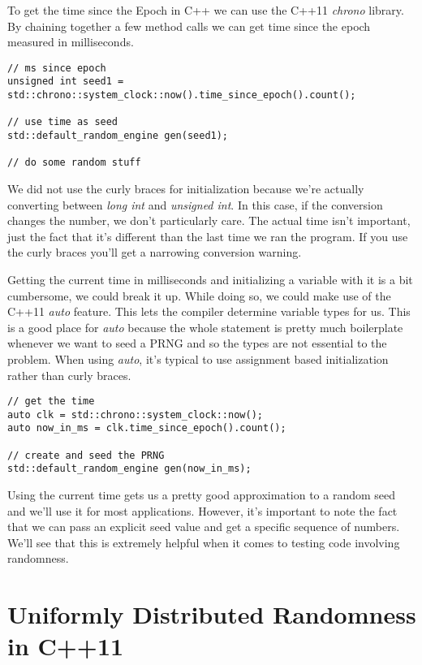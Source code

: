 \documentclass[]{tufte-handout}
\begin{document}
To get the time since the Epoch in C++ we can use the C++11 \textit{chrono} library. By chaining together a few method calls we can get time since the epoch measured in milliseconds.
\begin{verbatim}
// ms since epoch
unsigned int seed1 = std::chrono::system_clock::now().time_since_epoch().count();

// use time as seed
std::default_random_engine gen(seed1);    

// do some random stuff
\end{verbatim}
We did not use the curly braces for initialization because we're actually converting between \textit{long int} and \textit{unsigned int}. In this case, if the conversion changes the number, we don't particularly care.  The actual time isn't important, just the fact that it's different than the last time we ran the program. If you use the curly braces you'll get a narrowing conversion warning. 

Getting the current time in milliseconds and initializing a variable with it is a bit cumbersome, we could break it up. While doing so, we could make use of the C++11 \textit{auto} feature. This lets the compiler determine variable types for us. This is a good place for \textit{auto} because the whole statement is pretty much boilerplate whenever we want to seed a PRNG and so the types are not essential to the problem. When using \textit{auto}, it's typical to use assignment based initialization rather than curly braces. 

\begin{verbatim}
// get the time 
auto clk = std::chrono::system_clock::now();
auto now_in_ms = clk.time_since_epoch().count();

// create and seed the PRNG
std::default_random_engine gen(now_in_ms);    
\end{verbatim}

Using the current time gets us a pretty good approximation to a random seed and we'll use it for most applications. However, it's important to note the fact that we can pass an explicit seed value and get a specific sequence of numbers.  We'll see that this is extremely helpful when it comes to testing code involving randomness. 

\section{Uniformly Distributed Randomness in C++11}
\end{document}
